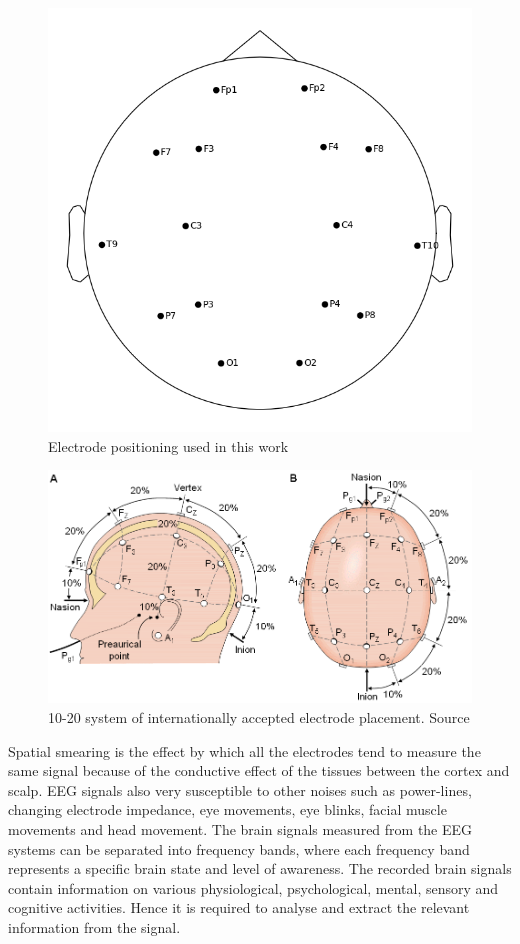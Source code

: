 \begin{figure}[H] 
    \begin{center}
    \includegraphics[height=0.6\textwidth]{images/obci_eegpose.png}
    \caption{Electrode positioning used in this work}
    \label{fig:obci_eegpose}
\end{center}
\end{figure}

\begin{figure}[H] 
    \begin{center}
    \includegraphics[height=0.6\textwidth]{images/10_20.png}
    \caption{10-20 system of internationally accepted electrode placement. Source \cite{1020_system}}
    \label{fig:10_20}
\end{center}
\end{figure}

Spatial smearing is the effect by which all the electrodes tend to measure the same signal because of the conductive effect of the tissues between the cortex and scalp. EEG signals also very susceptible to other noises such as power-lines, changing electrode impedance, eye movements, eye blinks, facial muscle movements and head movement\cite{2013_Book_BCI_Intro}. The brain signals measured from the EEG systems can be separated into frequency bands, where each frequency band represents a specific brain state and level of awareness. The recorded brain signals contain information on various physiological, psychological, mental, sensory and cognitive activities. Hence it is required to analyse and extract the relevant information from the signal.


